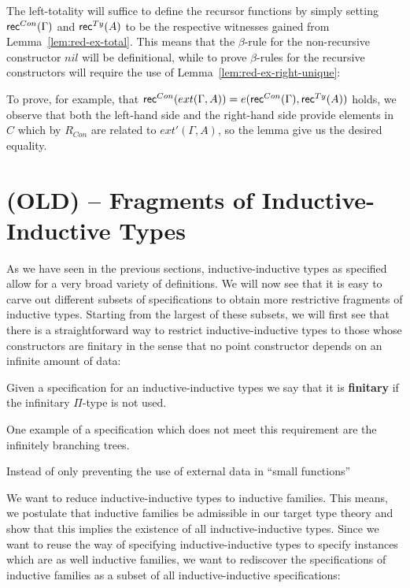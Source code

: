 The left-totality will suffice to define the recursor functions by simply setting
$\mathsf{rec}^{Con}(\Gamma)$ and $\mathsf{rec}^{Ty}(A)$ to be the respective witnesses gained from
Lemma~\ref{lem:red-ex-total}.
This means that the $\beta$-rule for the non-recursive constructor $nil$ will be
definitional, while to prove $\beta$-rules for the recursive constructors will
require the use of Lemma~\ref{lem:red-ex-right-unique}:

To prove, for example, that $\mathsf{rec}^{Con}(ext(\Gamma, A))
= e(\mathsf{rec}^{Con}(\Gamma), \mathsf{rec}^{Ty}(A))$ holds, we observe that both the left-hand side
and the right-hand side provide elements in $C$ which by $R_{Con}$ are related
to $ext'(\Gamma, A)$, so the lemma give us the desired equality.


\section{(OLD) -- Fragments of Inductive-Inductive Types}

As we have seen in the previous sections, inductive-inductive types as specified
allow for a very broad variety of definitions.
We will now see that it is easy to carve out different subsets of specifications
to obtain more restrictive fragments of inductive types.
Starting from the largest of these subsets, we will first see that there is a
straightforward way to restrict inductive-inductive types to those whose constructors
are finitary in the sense that no point constructor depends on an infinite
amount of data: %

\begin{defn}
Given a specification \grm{\Gamma} for an inductive-inductive types we say that
it is \textbf{finitary} if the infinitary $\Pi$-type is not used.
\end{defn}

One example of a specification which does not meet this requirement are the
infinitely branching trees. %

Instead of only preventing the use of external data in ``small functions''

We want to reduce inductive-inductive types to inductive families.
This means, we postulate that inductive families be admissible in our target
type theory and show that this implies the existence of all inductive-inductive
types.
Since we want to reuse the way of specifying inductive-inductive types to specify
instances which are as well inductive families, we want to rediscover the specifications
of inductive families as a subset of all inductive-inductive specifications:

